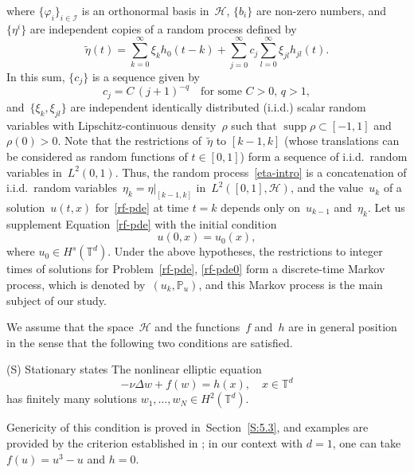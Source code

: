 \documentclass[JEP,XML,SOM,Unicode,ThmDefs]{cedram}
\let\mathcal\mathscr
\theoremstyle{plain}
\numberwithin{equation}{section}
\newcommand{\IP}{{\mathbb P}}
\newcommand{\T}{{\mathbb T}}
\DeclareMathOperator{\supp}{supp}
\newcommand{\HH}{{\mathcal H}}
\newcommand{\II}{{\mathcal I}}
\begin{document}
where $\{\varphi_i\}_{i\in\II}$ is an orthonormal basis in~$\HH$, $\{b_i\}$ are non-zero numbers, and~$\{\eta^i\}$ are independent copies of a random process defined by
\begin{equation} \label{0.3}
\tilde\eta(t)=\sum_{k=0}^\infty \xi_k h_0(t-k)
+\sum_{j=0}^\infty c_j\sum_{l=0}^\infty \xi_{jl}h_{jl}(t).
\end{equation}
In this sum, $\{c_j\}$ is a sequence given by
\begin{equation}\label{cj}
c_j=C\,(j+1)^{-q}\quad \text{for some $C>0$, $q>1$},
\end{equation}
and~$\{\xi_k,\xi_{jl}\}$ are independent identically distributed (i.i.d.) scalar random variables with Lipschitz-continuous density~$\rho$ such that $ \supp\rho\subset[-1,1]$ and $\rho(0)>0$. Note that the restrictions of~$\tilde\eta$ to $[k-1,k]$ (whose translations can be considered as random functions of $t\in[0,1]$) form a sequence of i.i.d.\ random variables in~$L^2(0,1)$. Thus, the random process~\eqref{eta-intro} is a concatenation of i.i.d.\ random variables~$\eta_k=\eta|_{[k-1,k]}$ in~$L^2([0,1],\HH)$, and the value~$u_k$ of a solution~$u(t,x)$ for~\eqref{rf-pde} at time $t=k$ depends only on~$u_{k-1}$ and~$\eta_k$. Let us supplement Equation~\eqref{rf-pde} with the initial condition
\begin{equation}\label{rf-pde0}
u(0,x)=u_0(x),
\end{equation}
where $u_0\in H^s(\T^d)$. Under the above hypotheses, the restrictions to integer times of solutions for Problem~\eqref{rf-pde}, \eqref{rf-pde0} form a discrete-time Markov process, which is denoted by~$(u_k,\IP_u)$, and this Markov process is the main subject of our study.

We assume that the space~$\HH$ and the functions~$f$ and~$h$ are in general position in the sense that the following two conditions are satisfied.
\begin{enonce*}{\hypertarget{S}{(S)} Stationary states}
The nonlinear elliptic equation
\begin{equation} \label{stationary-eq}
-\nu\Delta w+f(w)=h(x), \quad x\in\T^d
\end{equation}
has finitely many solutions $w_1,\dots,w_N\in H^2(\T^d)$.
\end{enonce*}

Genericity of this condition is proved in~Section~\ref{S:5.3}, and examples are provided by the criterion established in \cite[\S 5]{CI-1974}; \eg in our context with $d=1$, one can take $f(u)=u^3-u$ and $h=0$.
\end{document}
